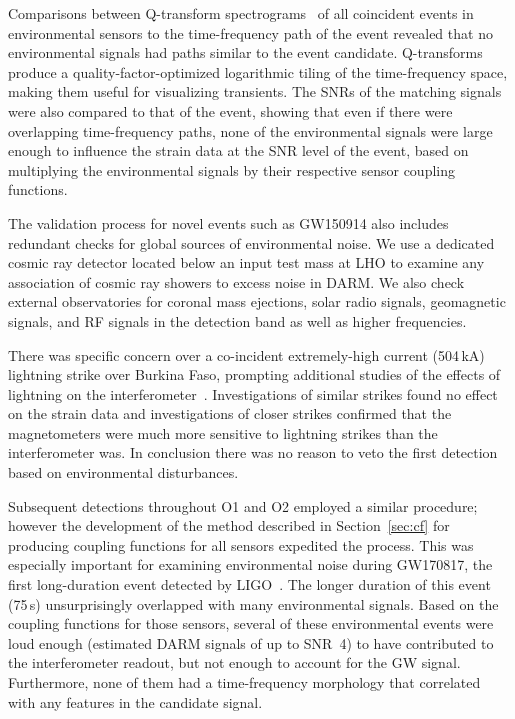 Comparisons between Q-transform spectrograms~\citep{Chatterji_2004} of all coincident events in environmental sensors to the time-frequency path of the event revealed that no environmental signals had paths similar to the event candidate.
Q-transforms produce a quality-factor-optimized logarithmic tiling of the time-frequency space, making them useful for visualizing transients.
The \acp{SNR} of the matching signals were also compared to that of the event, showing that even if there were overlapping time-frequency paths, none of the environmental signals were large enough to influence the strain data at the \ac{SNR} level of the event, based on multiplying the environmental signals by their respective sensor coupling functions.

The validation process for novel events such as GW150914 also includes redundant checks for global sources of environmental noise.
We use a dedicated cosmic ray detector located below an input test mass at \ac{LHO} to examine any association of cosmic ray showers to excess noise in \ac{DARM}.
We also check external observatories for coronal mass ejections, solar radio signals, geomagnetic signals, and \ac{RF} signals in the detection band as well as higher frequencies.

There was specific concern over a co-incident extremely-high current (504\,kA) lightning strike over Burkina Faso, prompting additional studies of the effects of lightning on the interferometer~\citep{Schofield_lightning}.
Investigations of similar strikes found no effect on the strain data and investigations of closer strikes confirmed that the magnetometers were much more sensitive to lightning strikes than the interferometer was.
In conclusion there was no reason to veto the first detection based on environmental disturbances.

Subsequent detections throughout \ac{O1} and \ac{O2} employed a similar procedure; however the development of the method described in Section~\ref{sec:cf} for producing coupling functions for all sensors expedited the process.
This was especially important for examining environmental noise during GW170817, the first long-duration event detected by \ac{LIGO}~\citep{gw170817, Schofield_170817}.
The longer duration of this event (75\,s) unsurprisingly overlapped with many environmental signals.
Based on the coupling functions for those sensors, several of these environmental events were loud enough (estimated \ac{DARM} signals of up to \ac{SNR}~4) to have contributed to the interferometer readout, but not enough to account for the \ac{GW} signal.
Furthermore, none of them had a time-frequency morphology that correlated with any features in the candidate signal.

